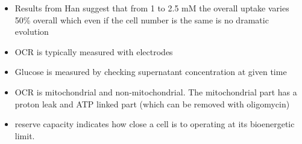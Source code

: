 \documentclass[11pt,a4paper]{article}
\begin{document}
\begin{itemize}
\item Results from Han suggest that from 1 to 2.5 mM the overall uptake varies 50\% overall which even if the cell number is the same is no dramatic evolution \cite{Han062015}

\item  OCR is typically measured with electrodes \cite{Divakaruni2022} 

\item Glucose is measured by checking supernatant concentration at given time 

\item OCR is mitochondrial and non-mitochondrial. The mitochondrial part has a proton leak and ATP linked part (which can be removed with oligomycin) \cite{Hill2012}

\item reserve capacity indicates how close a cell is to operating at its bioenergetic limit. \cite{Hill2012}
\end{itemize}
\end{document}
